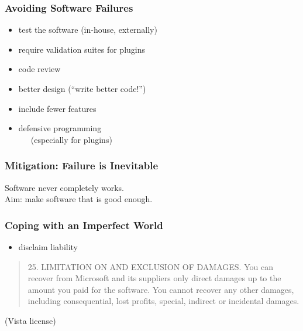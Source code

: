 \documentclass{beamer}
\newenvironment{changemargin}[1]{%
  \begin{list}{}{%
    \setlength{\topsep}{0pt}%
    \setlength{\leftmargin}{#1}%
    \setlength{\rightmargin}{1em}
    \setlength{\listparindent}{\parindent}%
    \setlength{\itemindent}{\parindent}%
    \setlength{\parsep}{\parskip}%
  }%
  \item[]}{\end{list}}
\begin{document}
\begin{frame}
  \frametitle{Avoiding Software Failures}

  \Large
    \begin{changemargin}{2em}
  \begin{itemize}
   \item test the software (in-house, externally)
   \item require validation suites for plugins
   \item code review
   \item better design (``write better code!'')
   \item include fewer features
   \item defensive programming \\~~~(especially for plugins)
  \end{itemize}
    \end{changemargin}
  
\end{frame}

\begin{frame}
  \frametitle{Mitigation: Failure is Inevitable}

  \Large
  \begin{changemargin}{2em}
  Software never completely works.\\[1em]

  Aim: make software that is good enough.
  \end{changemargin}

\end{frame}

\begin{frame}
  \frametitle{Coping with an Imperfect World}

    \begin{changemargin}{2em}

  \begin{itemize}
   \item disclaim liability
  \end{itemize}

\begin{quote}
25. LIMITATION ON AND EXCLUSION OF DAMAGES. You can recover from
Microsoft and its suppliers only direct damages up to the amount you
paid for the software. You cannot recover any other damages, including
consequential, lost profits, special, indirect or incidental damages.
\end{quote}
\hfill (Vista license)
    \end{changemargin}
    
\end{frame}
\end{document}

